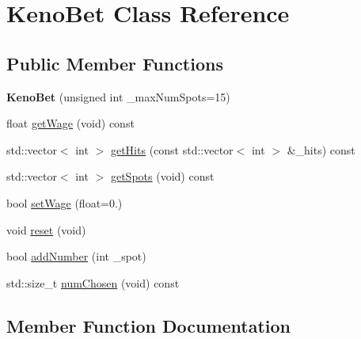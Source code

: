 \hypertarget{class_keno_bet}{}\section{Keno\+Bet Class Reference}
\label{class_keno_bet}
\subsection*{Public Member Functions}
\begin{DoxyCompactItemize}
\item 
{\bfseries Keno\+Bet} (unsigned int \+\_\+max\+Num\+Spots=15)\hypertarget{class_keno_bet_a499e1a938d0dee8d5cb91d032851bdda}{}\label{class_keno_bet_a499e1a938d0dee8d5cb91d032851bdda}

\item 
float \hyperlink{class_keno_bet_a004aae494dff90ba8b97e0d2f422de60}{get\+Wage} (void) const 
\item 
std\+::vector$<$ int $>$ \hyperlink{class_keno_bet_a21292f83047adbf6478f31a5fe5dc901}{get\+Hits} (const std\+::vector$<$ int $>$ \&\+\_\+hits) const 
\item 
std\+::vector$<$ int $>$ \hyperlink{class_keno_bet_a219a00440238516ab80f4471dd84f812}{get\+Spots} (void) const 
\item 
bool \hyperlink{class_keno_bet_ae647be06e566e6a0d4c766a9f9e5a61c}{set\+Wage} (float=0.)
\item 
void \hyperlink{class_keno_bet_acc2afd4d502e44fdfbb122f3389bc633}{reset} (void)
\item 
bool \hyperlink{class_keno_bet_a4302a2ea194138338de0420463188ede}{add\+Number} (int \+\_\+spot)
\item 
std\+::size\+\_\+t \hyperlink{class_keno_bet_a65f3e4d2710ab66a410a0432b5988c24}{num\+Chosen} (void) const 
\end{DoxyCompactItemize}


\subsection{Member Function Documentation}
